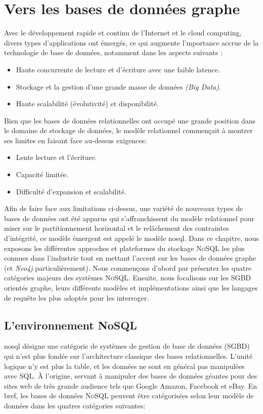 \chapter{Vers les bases de données graphe}
\label{ch:graph-db}
Avec le développement rapide et continu de l'Internet et le cloud
computing, divers types d'applications ont émergés, ce qui augmente
l'mportance accrue de la technologie de base de données, notamment
dans les aspects suivants \cite{han2011survey}:

\begin{itemize}
\item Haute concurrente de lecture et d'écriture avec une faible
  latence.
\item Stockage et la gestion d'une grande masse de données \emph{(Big
    Data)}.
\item Haute scalabilité (évolutivité) et disponibilité.
\end{itemize}

Bien que les bases de données relationnelles ont occupé une grande
position dans le domaine de stockage de données, le modèle relationnel
commençait à montrer ses limites en faisant face au-dessus exigences:

\begin{itemize}
\item Lente lecture et l'écriture.
\item Capacité limitée.
\item Difficulté d'expansion et scalabilité.
\end{itemize}

Afin de faire face aux limitations ci-dessus, une variété de nouveaux
types de bases de données ont été apparus qui s'affranchissent du
modèle relationnel pour miser sur le partitionnement horizontal et le
relâchement des contraintes d'intégrité, ce modèle émergent est appelé
le modèle \acrshort{nosql}. Dans ce chapitre, nous exposons les
différentes approches et plateformes du stockage \textsc{NoSQL} les
plus connues dans l'industrie tout en mettant l'accent sur les bases
de données graphe (et \emph{Neo4j} particulièrement). Nous commençons
d'abord par présenter les quatre catégories majeurs des systèmes
\textsc{NoSQL}. Ensuite, nous focalisons sur les \acrshort{SGBD}
orientés graphe, leurs différents modèles et implémentations ainsi que
les langages de requête les plus adoptés pour les interroger.


\section{L'environnement NoSQL}
\label{sec:nosql}
\acrshort{nosql} désigne une catégorie de systèmes de gestion de base
de données (\acrshort{SGBD}) qui n'est plus fondée sur l'architecture
classique des bases relationnelles. L'unité logique n'y est plus la
table, et les données ne sont en général pas manipulées avec
\textsc{SQL}. À l'origine, servant à manipuler des bases de données
géantes pour des sites web de très grande audience tels que Google
Amazon, Facebook et eBay. En bref, les bases de données \textsc{NoSQL}
peuvent être catégorisées selon leur modèle de données dans les
quatres catégories suivantes:

